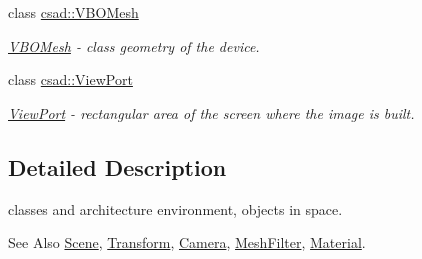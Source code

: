 \begin{DoxyCompactItemize}
class \hyperlink{classcsad_1_1_v_b_o_mesh}{csad\-::\-V\-B\-O\-Mesh}
\begin{DoxyCompactList}\small\item\em \hyperlink{classcsad_1_1_v_b_o_mesh}{V\-B\-O\-Mesh} -\/ class geometry of the device. \end{DoxyCompactList}\item 
class \hyperlink{classcsad_1_1_view_port}{csad\-::\-View\-Port}
\begin{DoxyCompactList}\small\item\em \hyperlink{classcsad_1_1_view_port}{View\-Port} -\/ rectangular area of the screen where the image is built. \end{DoxyCompactList}\end{DoxyCompactItemize}


\subsection{Detailed Description}
classes and architecture environment, objects in space. \begin{DoxySeeAlso}{See Also}
\hyperlink{classcsad_1_1_scene}{Scene}, \hyperlink{classcsad_1_1_transform}{Transform}, \hyperlink{classcsad_1_1_camera}{Camera}, \hyperlink{classcsad_1_1_mesh_filter}{Mesh\-Filter}, \hyperlink{classcsad_1_1_material}{Material}. 
\end{DoxySeeAlso}
